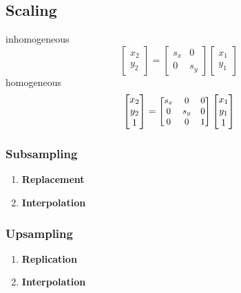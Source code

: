 \subsection{Scaling}
inhomogeneous
\[\begin{bmatrix}
  x_2\\
  y_2
\end{bmatrix} =
\begin{bmatrix}
  s_x & 0\\
  0 & s_y
\end{bmatrix}
\begin{bmatrix}
  x_1\\
  y_1
\end{bmatrix}\]
homogeneous
\[\begin{bmatrix}
  x_2\\
  y_2\\
  1
\end{bmatrix}=
{\small
\begin{bmatrix}
  s_x & 0 & 0\\
  0 & s_y & 0\\
  0 & 0 & 1
\end{bmatrix}}
\begin{bmatrix}
  x_1\\
  y_1\\
  1
\end{bmatrix}
\]
\subsubsection{Subsampling}
\begin{enumerate}
  \item \textbf{Replacement}
  \item \textbf{Interpolation}
\end{enumerate}
\subsubsection{Upsampling}
\begin{enumerate}
  \item\textbf{Replication}\\
  \item\textbf{Interpolation}\\
\end{enumerate}
